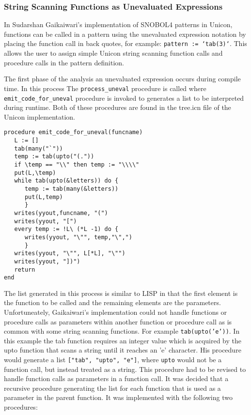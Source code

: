 \documentclass{article}
\begin{document}
\subsubsection{String Scanning Functions as Unevaluated Expressions}
In Sudarshan Gaikaiwari's implementation of SNOBOL4 patterns in Unicon, functions can be called in a pattern using the unevaluated expression notation by placing the function call in back quotes, for example: \texttt{pattern := `tab(3)`}.  This allows the user to assign simple Unicon string scanning function calls and procedure calls in the pattern definition. 

The first phase of the analysis an unevaluated expression occurs during compile time.  In this process The \texttt{process\_uneval} procedure is called where \texttt{emit\_code\_for\_uneval} procedure is invoked to generates a list to be interpreted during runtime.  Both of these procedures are found in the tree.icn file of the Unicon implementation.
\begin{verbatim}
procedure emit_code_for_uneval(funcname)
   L := []
   tab(many("`"))
   temp := tab(upto("(.")) 
   if \temp == "\\" then temp := "\\\\"
   put(L,\temp)
   while tab(upto(&letters)) do {
      temp := tab(many(&letters))
      put(L,temp)
      }
   writes(yyout,funcname, "(")
   writes(yyout, "[")
   every temp := !L\ (*L -1) do {
      writes(yyout, "\"", temp,"\",")
      }
   writes(yyout, "\"", L[*L], "\"")
   writes(yyout, "])")
   return
end
\end{verbatim}
The list generated in this process is similar to LISP in that the first element is the function to be called and the remaining elements are the parameters.  Unfortuneately, Gaikaiwari's implementation could not handle functions or procedure calls as parameters within another function or procedure call as is common with some string scanning functions.  For example \texttt{tab(upto('e'))}.  In this example the tab function requires an integer value which is acquired by the upto function that scans a string until it reaches an 'e' character.  His procedure would generate a list \texttt{["tab", "upto", "e"]}, where \texttt{upto} would not be a function call, but instead treated as a string.  This procedure had to be revised to handle function calls as parameters in a function call.  It was decided that a recursive procedure generating the list for each function that is used as a parameter in the parent function.  It was implemented with the following two procedures: 
\end{document}
